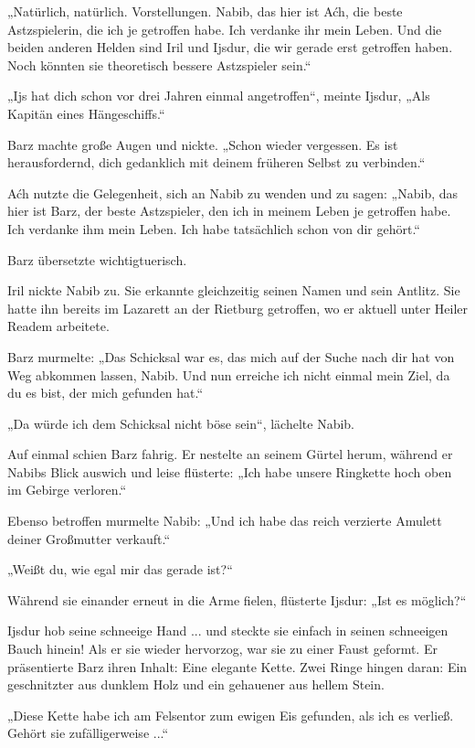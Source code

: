„Natürlich, natürlich. Vorstellungen. Nabib, das hier ist Aćh, die beste Astzspielerin, die ich je getroffen habe. Ich verdanke ihr mein Leben. Und die beiden anderen Helden sind Iril und Ijsdur, die wir gerade erst getroffen haben. Noch könnten sie theoretisch bessere Astzspieler sein.“

„Ijs hat dich schon vor drei Jahren einmal angetroffen“, meinte Ijsdur, „Als Kapitän eines Hängeschiffs.“

Barz machte große Augen und nickte. „Schon wieder vergessen. Es ist herausfordernd, dich gedanklich mit deinem früheren Selbst zu verbinden.“

Aćh nutzte die Gelegenheit, sich an Nabib zu wenden und zu sagen: „Nabib, das hier ist Barz, der beste Astzspieler, den ich in meinem Leben je getroffen habe. Ich verdanke ihm mein Leben. Ich habe tatsächlich schon von dir gehört.“

Barz übersetzte wichtigtuerisch.

Iril nickte Nabib zu. Sie erkannte gleichzeitig seinen Namen und sein Antlitz. Sie hatte ihn bereits im Lazarett an der Rietburg getroffen, wo er aktuell unter Heiler Readem arbeitete.

Barz murmelte: „Das Schicksal war es, das mich auf der Suche nach dir hat von Weg abkommen lassen, Nabib. Und nun erreiche ich nicht einmal mein Ziel, da du es bist, der mich gefunden hat.“

„Da würde ich dem Schicksal nicht böse sein“, lächelte Nabib.

Auf einmal schien Barz fahrig. Er nestelte an seinem Gürtel herum, während er Nabibs Blick auswich und leise flüsterte: „Ich habe unsere Ringkette hoch oben im Gebirge verloren.“

Ebenso betroffen murmelte Nabib: „Und ich habe das reich verzierte Amulett deiner Großmutter verkauft.“

„Weißt du, wie egal mir das gerade ist?“

Während sie einander erneut in die Arme fielen, flüsterte Ijsdur: „Ist es möglich?“

Ijsdur hob seine schneeige Hand ... und steckte sie einfach in seinen schneeigen Bauch hinein! Als er sie wieder hervorzog, war sie zu einer Faust geformt. Er präsentierte Barz ihren Inhalt: Eine elegante Kette. Zwei Ringe hingen daran: Ein geschnitzter aus dunklem Holz und ein gehauener aus hellem Stein.

„Diese Kette habe ich am Felsentor zum ewigen Eis gefunden, als ich es verließ. Gehört sie zufälligerweise ...“

